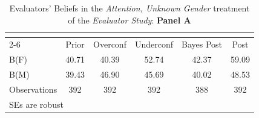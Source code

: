 \begin{table}[htbp]\centering
\caption{Evaluators' Beliefs in the \textit{Attention, Unknown Gender} treatment of the \textit{Evaluator Study}: \textbf{Panel A}}
\begin{tabular}{l*{5}{c}}
\hline\hline
                &\multicolumn{5}{c}{}                             \\\cmidrule(lr){2-6}
                &\multicolumn{1}{c}{Prior}&\multicolumn{1}{c}{Overconf}&\multicolumn{1}{c}{Underconf}&\multicolumn{1}{c}{Bayes Post}&\multicolumn{1}{c}{Post}\\
\hline
B(F)            &    40.71&    40.39&    52.74&    42.37&    59.09\\
B(M)            &    39.43&    46.90&    45.69&    40.02&    48.53\\
\hline
Observations    &      392&      392&      392&      388&      392\\
\hline\hline
\multicolumn{6}{l}{\footnotesize SEs are robust}\\
\end{tabular}
\end{table}
